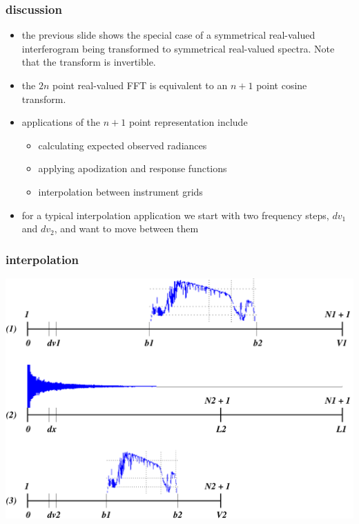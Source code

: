 \documentclass[11pt]{beamer}
\begin{document}
\begin{frame}
\frametitle{discussion}

\begin{itemize}
  \item the previous slide shows the special case of a symmetrical
    real-valued interferogram being transformed to symmetrical
    real-valued spectra.  Note that the transform is invertible.
  \item the $2n$ point real-valued FFT is equivalent to an $n+1$
    point cosine transform.
  \item applications of the $n+1$ point representation include
    \begin{itemize}
       \item calculating expected observed radiances
       \item applying apodization and response functions
       \item interpolation between instrument grids
    \end{itemize}
  \item for a typical interpolation application we start with two
    frequency steps, $dv_1$ and $dv_2$, and want to move between
    them
\end{itemize}

\end{frame}
\begin{frame}
\frametitle{interpolation}

\begin{center}
  \includegraphics[scale=0.4]{figures/interp_tfrm.pdf}
\end{center}

\end{frame}
\end{document}
